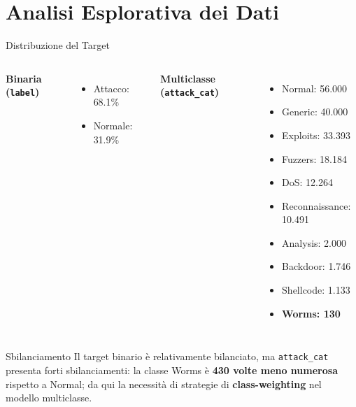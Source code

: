 \documentclass{beamer}
\begin{document}
\section{Analisi Esplorativa dei Dati}

\begin{frame}{Distribuzione del Target}
  \begin{columns}
    \textbf{Binaria (\texttt{label})}
    \begin{itemize}
      \item Attacco: 68.1\%
      \item Normale: 31.9\%
    \end{itemize}

    \textbf{Multiclasse (\texttt{attack\_cat})}
    \begin{itemize}
      \footnotesize
      \item Normal: 56.000
      \item Generic: 40.000
      \item Exploits: 33.393
      \item Fuzzers: 18.184
      \item DoS: 12.264
      \item Reconnaissance: 10.491
      \item Analysis: 2.000
      \item Backdoor: 1.746
      \item Shellcode: 1.133
      \item \textbf{Worms: 130}
    \end{itemize}
  \end{columns}
  \vspace{0.3cm}
  \begin{alertblock}{Sbilanciamento}
    Il target binario è relativamente bilanciato, ma \texttt{attack\_cat} presenta forti sbilanciamenti: la classe Worms è \textbf{430 volte meno numerosa} rispetto a Normal; da qui la necessità di strategie di \textbf{class-weighting} nel modello multiclasse.
  \end{alertblock}
\end{frame}
\end{document}

